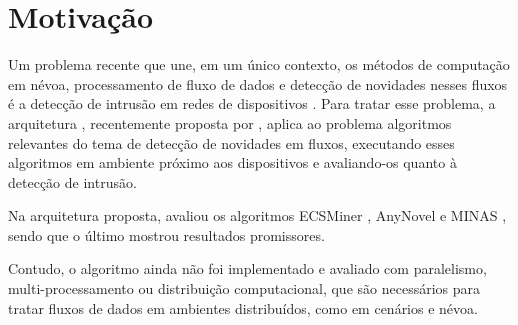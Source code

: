 \section{Motivação}\label{sec:motivo}


Um problema recente que une, em um único contexto, os métodos de computação em
névoa, processamento de fluxo de dados e detecção de novidades nesses fluxos é a
detecção de intrusão em redes de dispositivos \iot.
Para tratar esse problema, a arquitetura \arch, recentemente proposta por
, aplica ao problema algoritmos relevantes
do tema de detecção de
novidades em fluxos, executando esses algoritmos em ambiente próximo aos
dispositivos e avaliando-os quanto à detecção de intrusão.

Na arquitetura proposta,  avaliou os algoritmos
ECSMiner \cite{Masud2010ECSMiner}, AnyNovel \cite{Abdallah2016anynovel} e MINAS
\cite{Faria2016minas}, sendo que o último mostrou resultados promissores.

Contudo, o algoritmo \minas ainda não foi implementado e avaliado com paralelismo,
multi-processamento ou distribuição computacional, que são necessários para
tratar fluxos de dados 
em ambientes distribuídos, como em cenários \iot e névoa.

